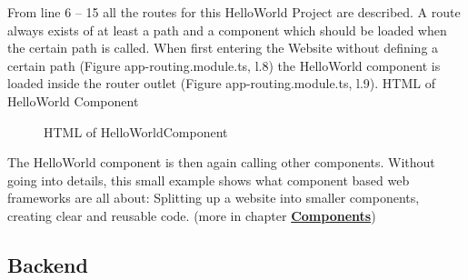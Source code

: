From line 6 – 15 all the routes for this HelloWorld Project are described. A route always exists of at least a path and a component which should be loaded when the certain path is called. When first entering the Website without defining a certain path (Figure app-routing.module.ts, l.8) the HelloWorld component is loaded inside the router outlet (Figure app-routing.module.ts, l.9). HTML of HelloWorld Component
\begin{figure}[h]
	\centering
	\caption{HTML of HelloWorldComponent}
	\label{fig:htmlhello}
\end{figure}
The HelloWorld component is then again calling other components. Without going into details, this small example shows what component based web frameworks are all about: Splitting up a website into smaller components, creating clear and reusable code. (more in chapter \hyperref[subsec:components]{\textbf{Components}})

\subsection{Backend}\label{subsec:backend}

